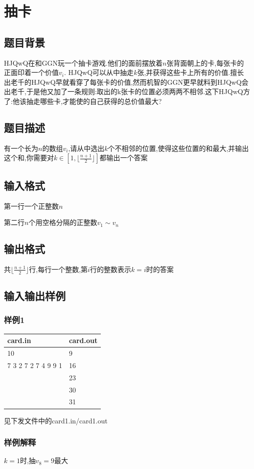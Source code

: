 \documentclass[12pt]{ctexart}
\begin{document}
\section{抽卡}
\subsection{题目背景}
HJQwQ在和GGN玩一个抽卡游戏.他们的面前摆放着$n$张背面朝上的卡,每张卡的正面印着一个价值$v_i$. HJQwQ可以从中抽走$k$张,并获得这些卡上所有的价值.擅长出老千的HJQwQ早就看穿了每张卡的价值,然而机智的GGN更早就料到HJQwQ会出老千,于是他又加了一条规则:取出的k张卡的位置必须两两不相邻.这下HJQwQ方了:他该抽走哪些卡,才能使的自己获得的总价值最大?
\subsection{题目描述}
有一个长为$n$的数组$v_i$,请从中选出$k$个不相邻的位置,使得这些位置的和最大,并输出这个和,你需要对$k\in\left[1,\lfloor\frac{n+1}{2}\rfloor\right]$都输出一个答案
\subsection{输入格式}
第一行一个正整数$n$

第二行$n$个用空格分隔的正整数$v_1\sim v_n$
\subsection{输出格式}
共$\lfloor\frac{n+1}{2}\rfloor$行,每行一个整数,第$i$行的整数表示$k=i$时的答案
\subsection{输入输出样例}
\subsubsection{样例1}
\begin{center}
	\begin{tabular}{|p{6cm}|p{6cm}|}
		\hline card.in&card.out\\
		\hline	10&9\\
				7 3 2 7 2 7 4 9 9 1&16\\
				&23\\
				&30\\
				&31\\
		\hline
	\end{tabular}
\end{center}
见下发文件中的card1.in/card1.out
\subsubsection{样例解释}
$k=1$时,抽$v_8=9$最大
\end{document}
